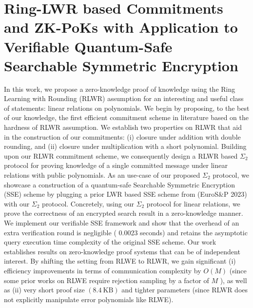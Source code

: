 \documentclass[11pt,oneside]{book}
\theoremstyle{definition}
\theoremstyle{remark}
\theoremstyle{plain}
\begin{document}
\section{\cite{cryptoeprint:2025/1216} Ring-{LWR} based Commitments and {ZK}-{PoKs} with Application to Verifiable Quantum-Safe Searchable Symmetric Encryption}
In this work, we propose a zero-knowledge proof of knowledge using the Ring Learning with Rounding (RLWR) assumption for an interesting and useful class of statements: linear relations on polynomials. We begin by proposing, to the best of our knowledge, the first efficient commitment scheme in literature based on the hardness of RLWR assumption. We establish two properties on RLWR that aid in the construction of our commitments: (i) closure under addition with double rounding, and (ii) closure under multiplication with a short polynomial. Building upon our RLWR commitment scheme, we consequently design a RLWR based $\Sigma_2$ protocol for proving knowledge of a single committed message under linear relations with public polynomials.
As an use-case of our proposed $\Sigma_2$ protocol, we showcase a construction of a quantum-safe Searchable Symmetric Encryption (SSE) scheme by plugging a prior LWR based SSE scheme from (EuroS\&P 2023) with our $\Sigma_2$ protocol. Concretely, using our $\Sigma_2$ protocol for linear relations, we prove the correctness of an encrypted search result in a zero-knowledge manner. We implement our verifiable SSE framework and show that the overhead of an extra verification round is negligible ( 0.0023 seconds) and retains the asymptotic query execution time complexity of the original SSE scheme.
Our work establishes results on zero-knowledge proof systems that can be of independent interest. By shifting the setting from RLWE to RLWR, we gain significant (i) efficiency improvements in terms of communication complexity by $O(M)$ (since some prior works on RLWE require rejection sampling by a factor of $M$ ), as well as (ii) very short proof size $(8.4 \mathrm{~KB})$ and tighter parameters (since RLWR does not explicitly manipulate error polynomials like RLWE).
\end{document}
